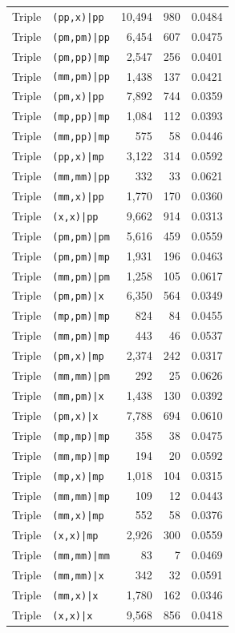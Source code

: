 \documentclass[11pt,a4paper]{article}
\theoremstyle{remark}\newtheorem{remark}[theorem]{Remark}
\begin{document}
\begin{longtable}{@{}llrrr@{}}
Triple & \texttt{(pp,x)|pp} & 10,494 & 980 & 0.0484 \\
Triple & \texttt{(pm,pm)|pp} & 6,454 & 607 & 0.0475 \\
Triple & \texttt{(pm,pp)|mp} & 2,547 & 256 & 0.0401 \\
Triple & \texttt{(mm,pm)|pp} & 1,438 & 137 & 0.0421 \\
Triple & \texttt{(pm,x)|pp} & 7,892 & 744 & 0.0359 \\
Triple & \texttt{(mp,pp)|mp} & 1,084 & 112 & 0.0393 \\
Triple & \texttt{(mm,pp)|mp} & 575 & 58 & 0.0446 \\
Triple & \texttt{(pp,x)|mp} & 3,122 & 314 & 0.0592 \\
Triple & \texttt{(mm,mm)|pp} & 332 & 33 & 0.0621 \\
Triple & \texttt{(mm,x)|pp} & 1,770 & 170 & 0.0360 \\
Triple & \texttt{(x,x)|pp} & 9,662 & 914 & 0.0313 \\
Triple & \texttt{(pm,pm)|pm} & 5,616 & 459 & 0.0559 \\
Triple & \texttt{(pm,pm)|mp} & 1,931 & 196 & 0.0463 \\
Triple & \texttt{(mm,pm)|pm} & 1,258 & 105 & 0.0617 \\
Triple & \texttt{(pm,pm)|x} & 6,350 & 564 & 0.0349 \\
Triple & \texttt{(mp,pm)|mp} & 824 & 84 & 0.0455 \\
Triple & \texttt{(mm,pm)|mp} & 443 & 46 & 0.0537 \\
Triple & \texttt{(pm,x)|mp} & 2,374 & 242 & 0.0317 \\
Triple & \texttt{(mm,mm)|pm} & 292 & 25 & 0.0626 \\
Triple & \texttt{(mm,pm)|x} & 1,438 & 130 & 0.0392 \\
Triple & \texttt{(pm,x)|x} & 7,788 & 694 & 0.0610 \\
Triple & \texttt{(mp,mp)|mp} & 358 & 38 & 0.0475 \\
Triple & \texttt{(mm,mp)|mp} & 194 & 20 & 0.0592 \\
Triple & \texttt{(mp,x)|mp} & 1,018 & 104 & 0.0315 \\
Triple & \texttt{(mm,mm)|mp} & 109 & 12 & 0.0443 \\
Triple & \texttt{(mm,x)|mp} & 552 & 58 & 0.0376 \\
Triple & \texttt{(x,x)|mp} & 2,926 & 300 & 0.0559 \\
Triple & \texttt{(mm,mm)|mm} & 83 & 7 & 0.0469 \\
Triple & \texttt{(mm,mm)|x} & 342 & 32 & 0.0591 \\
Triple & \texttt{(mm,x)|x} & 1,780 & 162 & 0.0346 \\
Triple & \texttt{(x,x)|x} & 9,568 & 856 & 0.0418 \\
\bottomrule
\end{longtable}
\end{document}
